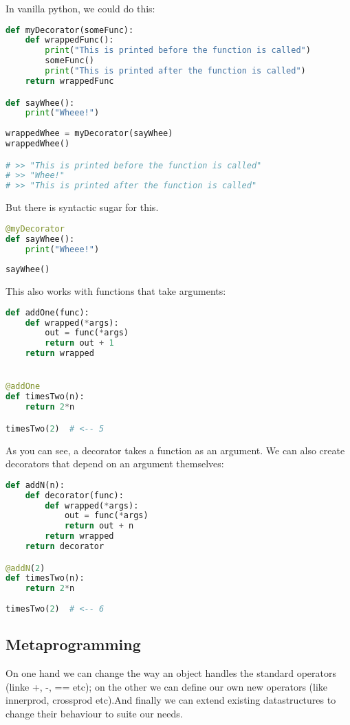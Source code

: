 In vanilla python, we could do this: 

\begin{lstlisting}[language=python]
def myDecorator(someFunc):
    def wrappedFunc():
        print("This is printed before the function is called")
        someFunc()
        print("This is printed after the function is called")
    return wrappedFunc

def sayWhee():
    print("Wheee!")
    
wrappedWhee = myDecorator(sayWhee)
wrappedWhee()

# >> "This is printed before the function is called"
# >> "Whee!"
# >> "This is printed after the function is called"
\end{lstlisting}


But there is syntactic sugar for this. 
\begin{lstlisting}[language=python]
@myDecorator
def sayWhee():
    print("Wheee!")
    
sayWhee()
\end{lstlisting}

This also works with functions that take arguments: 

\begin{lstlisting}[language=python]
def addOne(func):
    def wrapped(*args):
        out = func(*args)
        return out + 1
    return wrapped


@addOne
def timesTwo(n):
    return 2*n

timesTwo(2)  # <-- 5
\end{lstlisting}

As you can see, a decorator takes a function as an argument. We can also create decorators that depend on an argument themselves: 

\begin{lstlisting}[language=python]
def addN(n):
    def decorator(func):    
        def wrapped(*args):
            out = func(*args)
            return out + n
        return wrapped
    return decorator

@addN(2)
def timesTwo(n):
    return 2*n
    
timesTwo(2)  # <-- 6
\end{lstlisting}


\subsection{Metaprogramming}

On one hand we can change the way an object handles the standard operators (linke +, -, == etc); on the other we can define our own new operators (like innerprod, crossprod etc).And finally we can extend existing datastructures to change their behaviour to suite our needs. 

